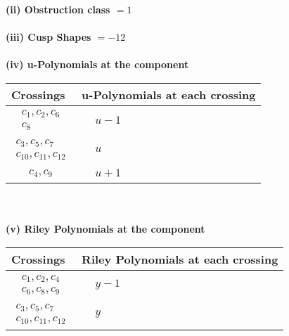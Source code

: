 \documentclass[1p]{elsarticle_modified}
\theoremstyle{definition}
\begin{document}
\flushleft \textbf{(ii) Obstruction class $= 1$}\\~\\
\flushleft \textbf{(iii) Cusp Shapes $= -12$}\\~\\
\newpage\renewcommand{\arraystretch}{1}
\flushleft \textbf{(iv) u-Polynomials at the component}\newline \\
\begin{tabular}{m{50pt}|m{274pt}}
Crossings & \hspace{64pt}u-Polynomials at each crossing \\
\hline $$\begin{aligned}c_{1},c_{2},c_{6}\\c_{8}\end{aligned}$$&$\begin{aligned}
&u-1
\end{aligned}$\\
\hline $$\begin{aligned}c_{3},c_{5},c_{7}\\c_{10},c_{11},c_{12}\end{aligned}$$&$\begin{aligned}
&u
\end{aligned}$\\
\hline $$\begin{aligned}c_{4},c_{9}\end{aligned}$$&$\begin{aligned}
&u+1
\end{aligned}$\\
\hline
\end{tabular}\\~\\
\newpage\renewcommand{\arraystretch}{1}
\flushleft \textbf{(v) Riley Polynomials at the component}\newline \\
\begin{tabular}{m{50pt}|m{274pt}}
Crossings & \hspace{64pt}Riley Polynomials at each crossing \\
\hline $$\begin{aligned}c_{1},c_{2},c_{4}\\c_{6},c_{8},c_{9}\end{aligned}$$&$\begin{aligned}
&y-1
\end{aligned}$\\
\hline $$\begin{aligned}c_{3},c_{5},c_{7}\\c_{10},c_{11},c_{12}\end{aligned}$$&$\begin{aligned}
&y
\end{aligned}$\\
\hline
\end{tabular}\\~\\
\end{document}
